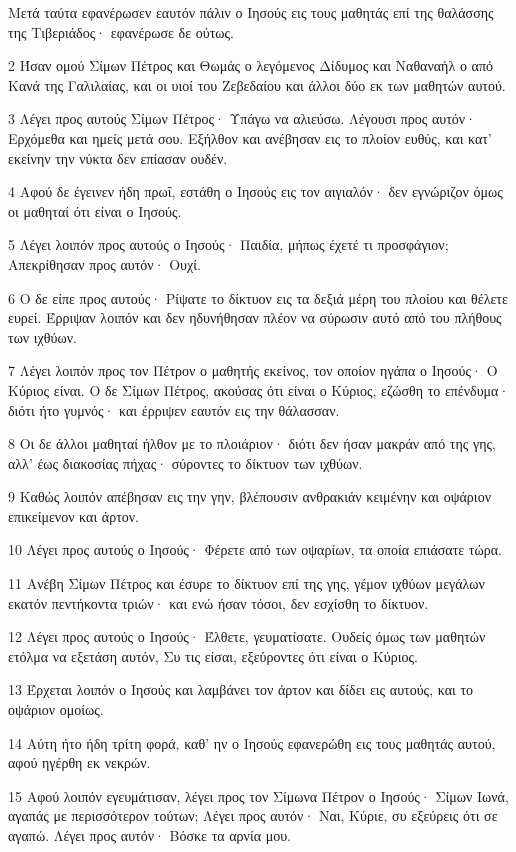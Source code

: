 \par Μετά ταύτα εφανέρωσεν εαυτόν πάλιν ο Ιησούς εις τους μαθητάς επί της θαλάσσης της Τιβεριάδος· εφανέρωσε δε ούτως.
\par 2 Ήσαν ομού Σίμων Πέτρος και Θωμάς ο λεγόμενος Δίδυμος και Ναθαναήλ ο από Κανά της Γαλιλαίας, και οι υιοί του Ζεβεδαίου και άλλοι δύο εκ των μαθητών αυτού.
\par 3 Λέγει προς αυτούς Σίμων Πέτρος· Υπάγω να αλιεύσω. Λέγουσι προς αυτόν· Ερχόμεθα και ημείς μετά σου. Εξήλθον και ανέβησαν εις το πλοίον ευθύς, και κατ' εκείνην την νύκτα δεν επίασαν ουδέν.
\par 4 Αφού δε έγεινεν ήδη πρωΐ, εστάθη ο Ιησούς εις τον αιγιαλόν· δεν εγνώριζον όμως οι μαθηταί ότι είναι ο Ιησούς.
\par 5 Λέγει λοιπόν προς αυτούς ο Ιησούς· Παιδία, μήπως έχετέ τι προσφάγιον; Απεκρίθησαν προς αυτόν· Ουχί.
\par 6 Ο δε είπε προς αυτούς· Ρίψατε το δίκτυον εις τα δεξιά μέρη του πλοίου και θέλετε ευρεί. Έρριψαν λοιπόν και δεν ηδυνήθησαν πλέον να σύρωσιν αυτό από του πλήθους των ιχθύων.
\par 7 Λέγει λοιπόν προς τον Πέτρον ο μαθητής εκείνος, τον οποίον ηγάπα ο Ιησούς· Ο Κύριος είναι. Ο δε Σίμων Πέτρος, ακούσας ότι είναι ο Κύριος, εζώσθη το επένδυμα· διότι ήτο γυμνός· και έρριψεν εαυτόν εις την θάλασσαν.
\par 8 Οι δε άλλοι μαθηταί ήλθον με το πλοιάριον· διότι δεν ήσαν μακράν από της γης, αλλ' έως διακοσίας πήχας· σύροντες το δίκτυον των ιχθύων.
\par 9 Καθώς λοιπόν απέβησαν εις την γην, βλέπουσιν ανθρακιάν κειμένην και οψάριον επικείμενον και άρτον.
\par 10 Λέγει προς αυτούς ο Ιησούς· Φέρετε από των οψαρίων, τα οποία επιάσατε τώρα.
\par 11 Ανέβη Σίμων Πέτρος και έσυρε το δίκτυον επί της γης, γέμον ιχθύων μεγάλων εκατόν πεντήκοντα τριών· και ενώ ήσαν τόσοι, δεν εσχίσθη το δίκτυον.
\par 12 Λέγει προς αυτούς ο Ιησούς· Έλθετε, γευματίσατε. Ουδείς όμως των μαθητών ετόλμα να εξετάση αυτόν, Συ τις είσαι, εξεύροντες ότι είναι ο Κύριος.
\par 13 Έρχεται λοιπόν ο Ιησούς και λαμβάνει τον άρτον και δίδει εις αυτούς, και το οψάριον ομοίως.
\par 14 Αύτη ήτο ήδη τρίτη φορά, καθ' ην ο Ιησούς εφανερώθη εις τους μαθητάς αυτού, αφού ηγέρθη εκ νεκρών.
\par 15 Αφού λοιπόν εγευμάτισαν, λέγει προς τον Σίμωνα Πέτρον ο Ιησούς· Σίμων Ιωνά, αγαπάς με περισσότερον τούτων; Λέγει προς αυτόν· Ναι, Κύριε, συ εξεύρεις ότι σε αγαπώ. Λέγει προς αυτόν· Βόσκε τα αρνία μου.
